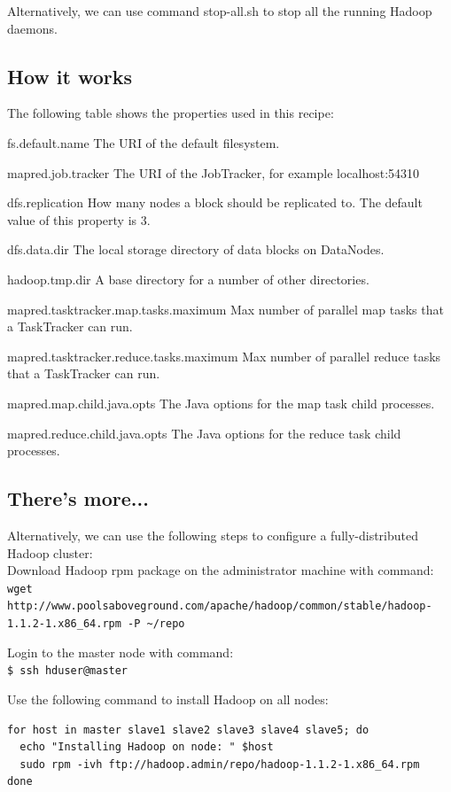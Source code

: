 Alternatively, we can use command stop-all.sh to stop all the running Hadoop daemons.

\subsection*{How it works}
The following table shows the properties used in this recipe:

\begin{description}
    \item{fs.default.name} The URI of the default filesystem.
    \item{mapred.job.tracker} The URI of the JobTracker, for example localhost:54310
    \item{dfs.replication} How many nodes a block should be replicated to. The default value of this property is 3.
    \item{dfs.data.dir} The local storage directory of data blocks on DataNodes.
    \item{hadoop.tmp.dir} A base directory for a number of other directories.
    \item{mapred.tasktracker.map.tasks.maximum} Max number of parallel map tasks that a TaskTracker can run.
    \item{mapred.tasktracker.reduce.tasks.maximum} Max number of parallel reduce tasks that a TaskTracker can run.
    \item{mapred.map.child.java.opts} The Java options for the map task child processes.
    \item{mapred.reduce.child.java.opts} The Java options for the reduce task child processes.
\end{description}

\subsection*{There's more...}
Alternatively, we can use the following steps to configure a fully-distributed Hadoop cluster: \\
Download Hadoop rpm package on the administrator machine with command: \\
\verb|wget http://www.poolsaboveground.com/apache/hadoop/common/stable/hadoop-1.1.2-1.x86_64.rpm -P ~/repo|

Login to the master node with command: \\
\verb|$ ssh hduser@master|

Use the following command to install Hadoop on all nodes:
\begin{verbatim}
for host in master slave1 slave2 slave3 slave4 slave5; do
  echo "Installing Hadoop on node: " $host
  sudo rpm -ivh ftp://hadoop.admin/repo/hadoop-1.1.2-1.x86_64.rpm
done
\end{verbatim}

